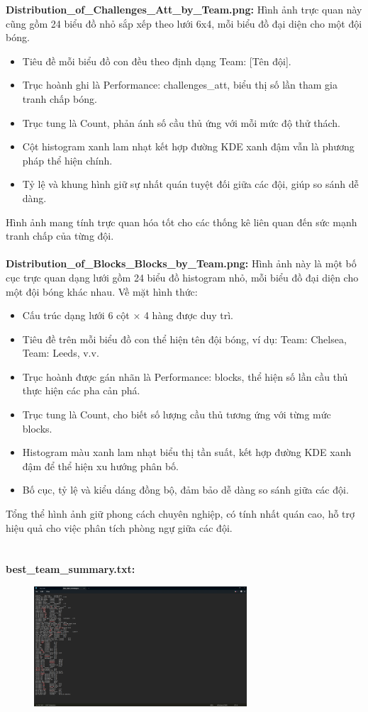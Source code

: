 \documentclass[12pt]{report}
\begin{document}
{\textbf{Distribution\_of\_Challenges\_Att\_by\_Team.png:}
Hình ảnh trực quan này cũng gồm 24 biểu đồ nhỏ sắp xếp theo lưới 6x4, mỗi biểu đồ đại diện cho một đội bóng.
\begin{itemize}
	\item Tiêu đề mỗi biểu đồ con đều theo định dạng Team: [Tên đội].
	\item Trục hoành ghi là Performance: challenges\_att, biểu thị số lần tham gia tranh chấp bóng.
	\item Trục tung là Count, phản ánh số cầu thủ ứng với mỗi mức độ thử thách.
	\item Cột histogram xanh lam nhạt kết hợp đường KDE xanh đậm vẫn là phương pháp thể hiện chính.
	\item Tỷ lệ và khung hình giữ sự nhất quán tuyệt đối giữa các đội, giúp so sánh dễ dàng.
\end{itemize}
Hình ảnh mang tính trực quan hóa tốt cho các thống kê liên quan đến sức mạnh tranh chấp của từng đội.
\\\\
\textbf{Distribution\_of\_Blocks\_Blocks\_by\_Team.png:}
Hình ảnh này là một bố cục trực quan dạng lưới gồm 24 biểu đồ histogram nhỏ, mỗi biểu đồ đại diện cho một đội bóng khác nhau. Về mặt hình thức:
\begin{itemize}
	\item Cấu trúc dạng lưới 6 cột × 4 hàng được duy trì.
	\item Tiêu đề trên mỗi biểu đồ con thể hiện tên đội bóng, ví dụ: Team: Chelsea, Team: Leeds, v.v.
	\item Trục hoành được gán nhãn là Performance: blocks, thể hiện số lần cầu thủ thực hiện các pha cản phá.
	\item Trục tung là Count, cho biết số lượng cầu thủ tương ứng với từng mức blocks.
	\item Histogram màu xanh lam nhạt biểu thị tần suất, kết hợp đường KDE xanh đậm để thể hiện xu hướng phân bố.
	\item Bố cục, tỷ lệ và kiểu dáng đồng bộ, đảm bảo dễ dàng so sánh giữa các đội.
\end{itemize}
Tổng thể hình ảnh giữ phong cách chuyên nghiệp, có tính nhất quán cao, hỗ trợ hiệu quả cho việc phân tích phòng ngự giữa các đội.\\
\\\\
\textbf{best\_team\_summary.txt:}
\begin{figure}[h]
    \centering
    \includegraphics[width=300px]{best_team_summary.png}

\end{figure}}
\end{document}
